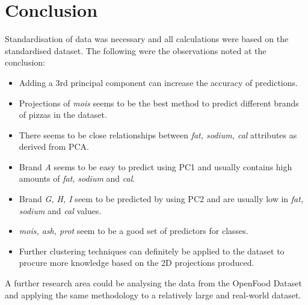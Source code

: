 \documentclass[preprint,12pt]{elsarticle}
\begin{document}
\section{Conclusion}
\label{s:Conclusion}
Standardisation of data was necessary and all calculations were based on the standardised dataset.
The following were the observations noted at the conclusion:
\begin{itemize}
\item Adding a 3rd principal component can increase the accuracy of predictions.
\item Projections of \textit{mois} seems to be the best method to predict different brands of pizzas in the dataset.
\item There seems to be close relationships between \textit{fat, sodium, cal } attributes as derived from PCA.
\item Brand \textit{A} seems to be easy to predict using PC1 and usually contains high amounts of \textit{fat, } \textit{sodium }and \textit{cal}.
\item Brand \textit{G, H, I} seem to be predicted by using PC2 and are usually low in \textit{fat, sodium }and \textit{cal} values.
\item \textit{mois, ash, prot} seem to be a good set of predictors for classes.
\item Further clustering techniques can definitely be applied to the dataset to procure more knowledge based on the 2D projections produced.
\end{itemize}

A further research area could be analysing the data from the OpenFood Dataset \cite{openFood2020} and applying the same methodology to a relatively large and real-world dataset.





%

\end{document}
